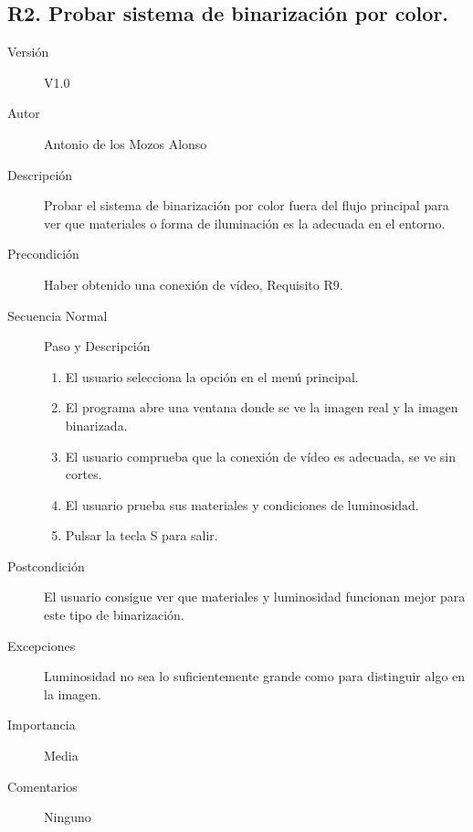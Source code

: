 \subsection{R2. Probar sistema de binarización por color.}
\begin{description}
	\item [Versión] V1.0
	\item [Autor] Antonio de los Mozos Alonso
	\item [Descripción] Probar el sistema de binarización por color fuera del flujo principal para ver que materiales o forma de iluminación es la adecuada en el entorno.
	\item [Precondición] Haber obtenido una conexión de vídeo, Requisito R9.
	\item [Secuencia Normal] Paso y Descripción
	
		\begin{enumerate}
			\item El usuario selecciona la opción en el menú principal.
			
			\item El programa abre una ventana donde se ve la imagen real y la imagen binarizada.
			
			\item El usuario comprueba que la conexión de vídeo es adecuada, se ve sin cortes.
			\item El usuario prueba sus materiales y condiciones de luminosidad.
			\item Pulsar la tecla S para salir.
		\end{enumerate}
	\item [Postcondición]  El usuario consigue ver que materiales y luminosidad funcionan mejor para este tipo de binarización.
	\item [Excepciones] Luminosidad no sea lo suficientemente grande como para distinguir algo en la imagen.
	\item [Importancia] Media
	\item [Comentarios] Ninguno
\end{description}


